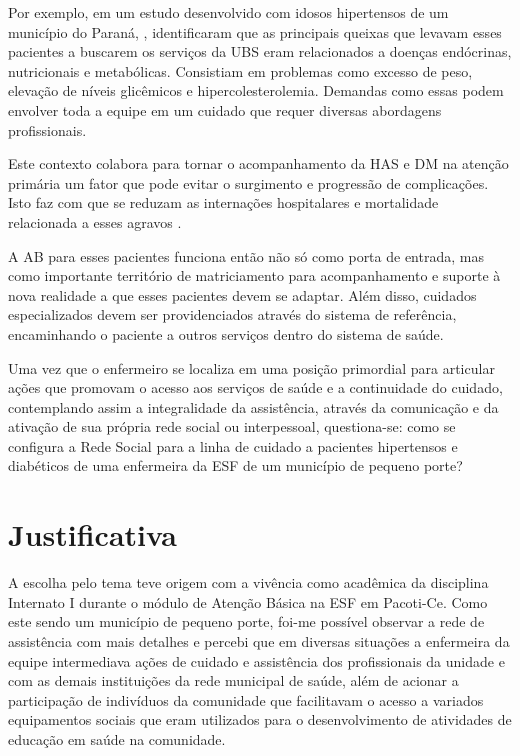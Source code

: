 Por exemplo, em um estudo desenvolvido com idosos hipertensos de um município do Paraná, \cite{ferrari2014motivos}, identificaram que as principais queixas que levavam esses pacientes a buscarem os serviços da \acrshort{UBS} eram relacionados a doenças endócrinas, nutricionais e metabólicas. Consistiam em problemas como excesso de peso, elevação de níveis glicêmicos e hipercolesterolemia. Demandas como essas podem envolver toda a equipe em um cuidado que requer diversas abordagens profissionais. 

Este contexto colabora para tornar o acompanhamento da \acrshort{HAS} e \acrshort{DM} na atenção primária um fator que pode evitar o surgimento e progressão de complicações. Isto faz com que se reduzam as internações hospitalares e mortalidade relacionada a esses agravos \cite{da2012associaccao}.

A \acrshort{AB} para esses pacientes funciona então não só como porta de entrada, mas como importante território de matriciamento para acompanhamento e suporte à nova realidade a que esses pacientes devem se adaptar. Além disso, cuidados especializados devem ser providenciados através do sistema de referência, encaminhando o paciente a outros serviços dentro do sistema de saúde. 

Uma vez que o enfermeiro se localiza em uma posição primordial para articular ações que promovam o acesso aos serviços de saúde e a continuidade do cuidado, contemplando assim a integralidade da assistência, através da comunicação e da ativação de sua própria rede social ou interpessoal, questiona-se: como se configura a Rede Social para a linha de cuidado a pacientes hipertensos e diabéticos de uma enfermeira da \acrshort{ESF} de um município de pequeno porte?

\section{Justificativa}
A escolha pelo tema teve origem com a vivência como acadêmica da disciplina Internato I durante o módulo de Atenção Básica na \acrshort{ESF} em Pacoti-Ce. Como este sendo um município de pequeno porte, foi-me possível observar a rede de assistência com mais detalhes e percebi que em diversas situações a enfermeira da equipe intermediava ações de cuidado e assistência dos profissionais da unidade e com as demais instituições da rede municipal de saúde, além de acionar a participação de indivíduos da comunidade que facilitavam o acesso a variados equipamentos sociais que eram utilizados para o desenvolvimento de atividades de educação em saúde na comunidade. 

